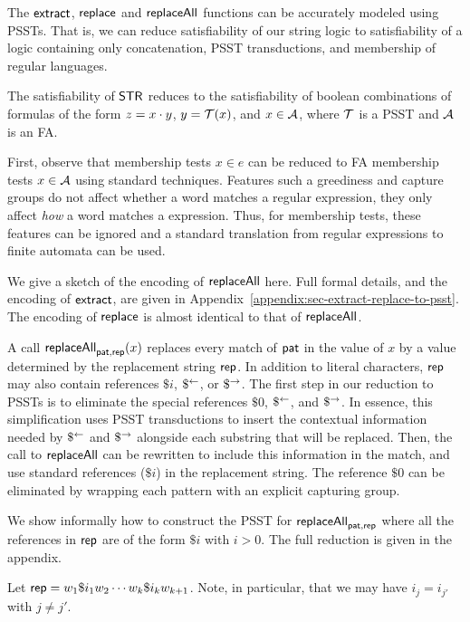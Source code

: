 
The $\mathsf{extract}$, $\mathsf{replace}$ and $\mathsf{replaceAll}$ functions can be accurately modeled using PSSTs.
That is, we can reduce satisfiability of our string logic to satisfiability of a logic containing only concatenation, PSST transductions, and membership of regular languages.

\begin{lemma}\label{lem-str-fun-to-psst}
    The satisfiability of $\mathsf{STR}$ reduces to the satisfiability of boolean combinations of formulas of the form $z=x \cdot y$, $y=\mathcal{T}(x)$, and $x \in \mathcal{A}$, where $\mathcal{T}$ is a PSST and $\mathcal{A}$ is an FA.
\end{lemma}

First, observe that membership tests $x \in e$ can be reduced to FA membership tests $x \in \mathcal{A}$ using standard techniques.
Features such a greediness and capture groups do not affect whether a word matches a regular expression, they only affect \emph{how} a word matches a expression.
Thus, for membership tests, these features can be ignored and a standard translation from regular expressions to finite automata can be used.

We give a sketch of the encoding of $\mathsf{replaceAll}$ here.
Full formal details, and the encoding of $\mathsf{extract}$, are given in Appendix~\ref{appendix:sec-extract-replace-to-psst}.
The encoding of $\mathsf{replace}$ is almost identical to that of $\mathsf{replaceAll}$.

A call $\mathsf{replaceAll}_{\mathsf{pat}, \mathsf{rep}}(x)$ replaces every match of $\mathsf{pat}$ in the value of $x$ by a value determined by the replacement string $\mathsf{rep}$.
In addition to literal characters, $\mathsf{rep}$ may also contain references $\$i$, $\$^{\leftarrow}$, or $\$^{\rightarrow}$.
The first step in our reduction to PSSTs is to eliminate the special references $\$0$, $\$^{\leftarrow}$, and $\$^{\rightarrow}$.
In essence, this simplification uses PSST transductions to insert the contextual information needed by $\$^{\leftarrow}$ and $\$^{\rightarrow}$ alongside each substring that will be replaced.
Then, the call to $\mathsf{replaceAll}$ can be rewritten to include this information in the match, and use standard references ($\$i$) in the replacement string.
The reference $\$0$ can be eliminated by wrapping each pattern with an explicit capturing group.

We show informally how to construct the PSST for $\mathsf{replaceAll}_{\mathsf{pat}, \mathsf{rep}}$ where all the references in $\mathsf{rep}$ are of the form $\$i$ with $i > 0$.
The full reduction is given in the appendix.

Let $\mathsf{rep} = w_1 \$i_1 w_2 \cdots w_k \$i_k w_{k+1}$.
Note, in particular, that we may have $i_j = i_{j'}$ with $j \neq j'$.

